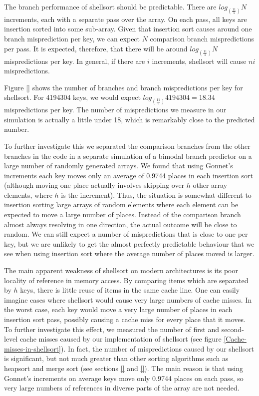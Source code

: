 \documentclass[acmtocl]{acmtrans2m}
\begin{document}
The branch performance of shellsort should be predictable. There are
$log_{(\frac{11}{5})}N$ increments, each with a separate pass over the
array. On each pass, all keys are insertion sorted into some
sub-array. Given that insertion sort causes around one branch
misprediction per key, we can expect $N$ comparison branch
mispredictions per pass. It is expected, therefore, that there will be
around $log_{(\frac{11}{5})}N$ mispredictions per key. In general, if
there are $i$ increments, shellsort will cause $ni$ mispredictions.

Figure \ref{} shows the number of branches and branch mispredictions
per key for shellsort. For 4194304 keys, we would expect
$log_{(\frac{11}{5})}4194304 = 18.34$ mispredictions per key. The
number of mispredictions we measure in our simulation is actually a
little under 18, which is remarkably close to the predicted number.

To further investigate this we separated the comparison branches from
the other branches in the code in a separate simulation of a bimodal
branch predictor on a large number of randomly generated arrays. We
found that using Gonnet's increments each key moves only an average of
0.9744 places in each insertion sort (although moving one place
actually involves skipping over $h$ other array elements, where $h$ is
the increment). Thus, the situation is somewhat different to insertion
sorting large arrays of random elements where each element can be
expected to move a large number of places. Instead of the comparison
branch almost always resolving in one direction, the actual outcome
will be close to random. We can still expect a number of
mispredictions that is close to one per key, but we are unlikely to
get the almost perfectly predictable behaviour that we see when using
insertion sort where the average number of places moved is larger.

The main apparent weakness of shellsort on modern architectures is its
poor locality of reference in memory access.  By comparing items which
are separated by $h$ keys, there is little reuse of items in the same
cache line. One can easily imagine cases where shellsort would cause
very large numbers of cache misses.  In the worst case, each key would
move a very large number of places in each insertion sort pass,
possibly causing a cache miss for every place that it moves.  To
further investigate this effect, we measured the number of first and
second-level cache misses caused by our implementation of shellsort
(see figure \ref{Cache-misses-in-shellsort}). In fact, the number of mispredictions caused by
our shellsort is significant, but not much greater than other sorting
algorithms such as heapsort and merge sort (see sections \ref{} and
\ref{}). The main reason is that using Gonnet's increments on average
keys move only 0.9744 places on each pass, so very large numbers of
references in diverse parts of the array are not needed.
\end{document}
